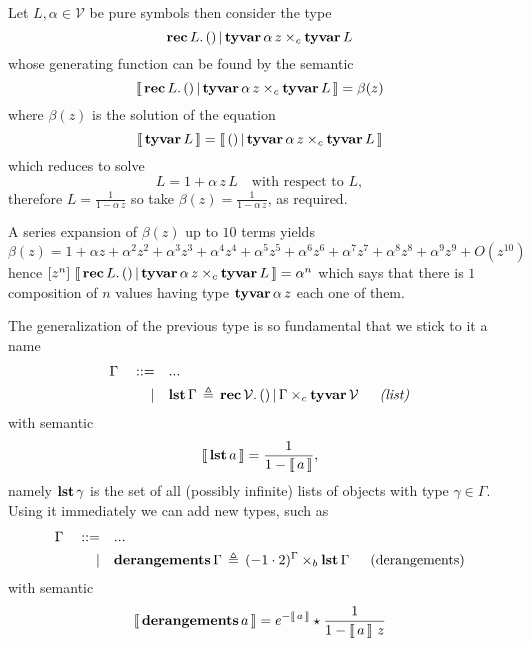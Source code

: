 \begin{example}
Let $L,\alpha\in\mathcal{V}$ be pure symbols then consider the type
\begin{displaymath}
    \textbf{rec}\,L.\,()\,|\,\textbf{tyvar}\,\alpha\,z\times_{c}\textbf{tyvar}\,L
\end{displaymath}
whose generating function can be found by the semantic
\begin{displaymath}
    \left\llbracket\,\textbf{rec}\,L.\,()\,|\,\textbf{tyvar}\,\alpha\,z\times_{c}\textbf{tyvar}\,L\,\right\rrbracket = \beta(z)
\end{displaymath}
where $\beta(z)$ is the solution of the equation
\begin{displaymath}
    \left\llbracket\,\textbf{tyvar}\,L\,\right\rrbracket = \left\llbracket\,()\,|\,\textbf{tyvar}\,\alpha\,z\times_{c}\textbf{tyvar}\,L\,\right\rrbracket
\end{displaymath}
which reduces to solve
\begin{displaymath}
    L = 1 + \alpha\,z\,L\quad\text{with respect to $L$},
\end{displaymath}
therefore $\displaystyle L = \frac{1}{1 - \alpha\,z}$
so take $\displaystyle \beta(z) = \frac{1}{1 - \alpha\,z}$, as required.

A series expansion of $\beta(z)$ up to $10$ terms yields
\begin{displaymath}
\beta(z) = 1 + \alpha z + \alpha^{2} z^{2} + \alpha^{3} z^{3} + \alpha^{4} z^{4} + \alpha^{5} z^{5} + \alpha^{6} z^{6} + \alpha^{7} z^{7} + \alpha^{8} z^{8} + \alpha^{9} z^{9} + O\left(z^{10}\right)
\end{displaymath}
hence $[z^{n}]\,\left\llbracket\,\textbf{rec}\,L.\,()\,|\,\textbf{tyvar}\,\alpha\,z\times_{c}\textbf{tyvar}\,L\,\right\rrbracket =
\alpha^{n}$ which says that there is $1$ composition of $n$ values having type
$\textbf{tyvar}\,\alpha\,z$ each one of them.
\end{example}

The generalization of the previous type is so fundamental that we stick to it a name
\begin{displaymath}
\begin{split}
    \Gamma\quad::=\quad&... \\
           |\quad&\lst{\Gamma}\,\triangleq\,\rec{\mathcal{V}}{()\,|\,\Gamma\times_{c}\tyvar{\mathcal{V}}}\indent\textit{(list)}
\end{split}
\end{displaymath}
with semantic
\begin{displaymath}
    \left\llbracket\,\textbf{lst}\,a\,\right\rrbracket = \frac{1}{1-\left\llbracket\,a\,\right\rrbracket},
\end{displaymath}
namely $\textbf{lst}\,\gamma$ is the set of all (possibly infinite) lists of
objects with type $\gamma\in\Gamma$. Using it immediately we can add new types, such
as
\begin{displaymath}
\begin{split}
    \Gamma\quad::=\quad&... \\
           |\quad&\derangements{\Gamma}\,\triangleq\,(-1\cdot2)^{\Gamma}\times_{b}\lst{\Gamma}\indent\text{(derangements)}
\end{split}
\end{displaymath}
with semantic
\begin{displaymath}
    \left\llbracket\,\textbf{derangements}\,a\,\right\rrbracket = e^{-\left\llbracket\,a\,\right\rrbracket}\star\frac{1}{1-\left\llbracket\,a\,\right\rrbracket\,z}
\end{displaymath}

